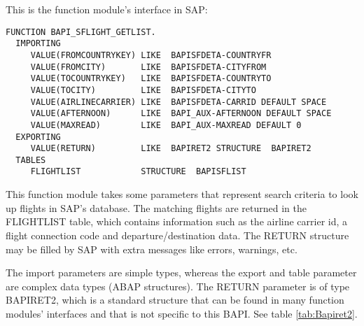 This is the function module's interface in SAP:

\begin{lstlisting}[language={[R/3 6.10]ABAP},caption=The ABAP Function]
FUNCTION BAPI_SFLIGHT_GETLIST.
  IMPORTING
     VALUE(FROMCOUNTRYKEY) LIKE  BAPISFDETA-COUNTRYFR
     VALUE(FROMCITY)       LIKE  BAPISFDETA-CITYFROM
     VALUE(TOCOUNTRYKEY)   LIKE  BAPISFDETA-COUNTRYTO
     VALUE(TOCITY)         LIKE  BAPISFDETA-CITYTO
     VALUE(AIRLINECARRIER) LIKE  BAPISFDETA-CARRID DEFAULT SPACE
     VALUE(AFTERNOON)      LIKE  BAPI_AUX-AFTERNOON DEFAULT SPACE
     VALUE(MAXREAD)        LIKE  BAPI_AUX-MAXREAD DEFAULT 0
  EXPORTING
     VALUE(RETURN)         LIKE  BAPIRET2 STRUCTURE  BAPIRET2
  TABLES
     FLIGHTLIST            STRUCTURE  BAPISFLIST
\end{lstlisting}

This function module takes some parameters that represent search criteria to look up flights in SAP's database.
The matching flights are returned in the FLIGHTLIST table, which contains information such as
the airline carrier id, a flight connection code and departure/destination data.
The RETURN structure may be filled by SAP with extra messages like errors, warnings, etc.

The import parameters are simple types, whereas the export and table parameter are complex data types (ABAP structures).
The RETURN parameter is of type BAPIRET2, which is a standard structure that can be found in many function modules'
interfaces and that is not specific to this BAPI. See table \ref{tab:Bapiret2}.

